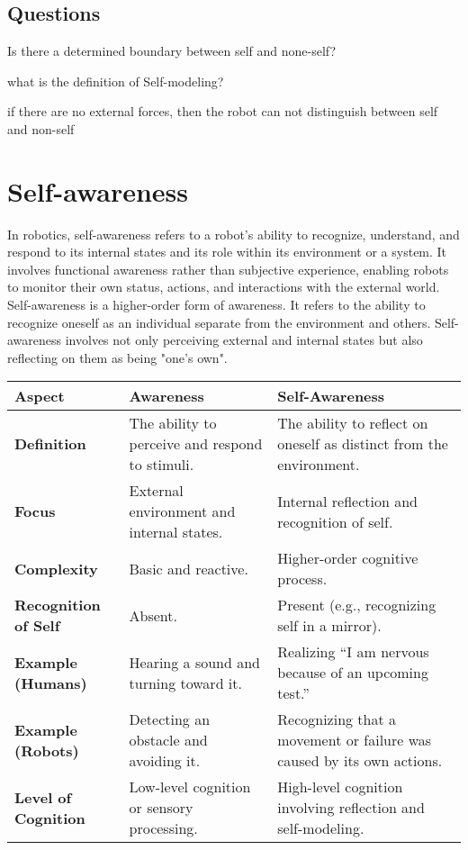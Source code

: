 \subsection{Questions}
Is there a determined boundary between self and none-self?

what is the definition of Self-modeling?

if there are no external forces, then the robot can not distinguish between self and non-self


\section{Self-awareness}
In robotics, self-awareness refers to a robot's ability to recognize, understand, and respond to its internal states and its role within its environment or a system. It involves functional awareness rather than subjective experience, enabling robots to monitor their own status, actions, and interactions with the external world. Self-awareness is a higher-order form of awareness. It refers to the ability to recognize oneself as an individual separate from the environment and others. Self-awareness involves not only perceiving external and internal states but also reflecting on them as being "one's own".
\begin{tabular}{|l|l|l|}
    \hline
    \textbf{Aspect}              & \textbf{Awareness}                              & \textbf{Self-Awareness}                                               \\ \hline
    \textbf{Definition}          & The ability to perceive and respond to stimuli. & The ability to reflect on oneself as distinct from the environment.   \\ \hline
    \textbf{Focus}               & External environment and internal states.       & Internal reflection and recognition of self.                          \\ \hline
    \textbf{Complexity}          & Basic and reactive.                             & Higher-order cognitive process.                                       \\ \hline
    \textbf{Recognition of Self} & Absent.                                         & Present (e.g., recognizing self in a mirror).                         \\ \hline
    \textbf{Example (Humans)}    & Hearing a sound and turning toward it.          & Realizing “I am nervous because of an upcoming test.”                 \\ \hline
    \textbf{Example (Robots)}    & Detecting an obstacle and avoiding it.          & Recognizing that a movement or failure was caused by its own actions. \\ \hline
    \textbf{Level of Cognition}  & Low-level cognition or sensory processing.      & High-level cognition involving reflection and self-modeling.          \\ \hline
\end{tabular}
